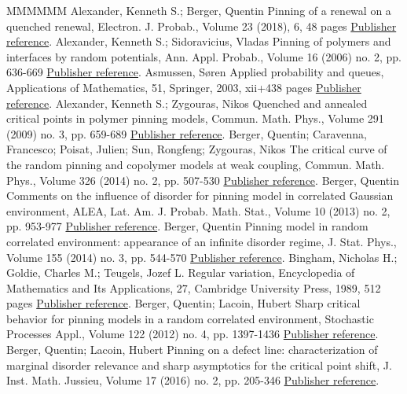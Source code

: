 \documentclass[11pt]{article}
\theoremstyle{definition}
\numberwithin{equation}{section}
\numberwithin{figure}{section}
\numberwithin{table}{section}
\begin{document}
\begin{thebibliography}{MMMMMM}
 Alexander, Kenneth S.; Berger, Quentin Pinning of a renewal on a quenched renewal, Electron. J. Probab., Volume 23 (2018), 6, 48 pages \href{https://ahl.centre-mersenne.org/item/AHL_2019__2__281_0/#A17_1}{Publisher reference}.
 Alexander, Kenneth S.; Sidoravicius, Vladas Pinning of polymers and interfaces by random potentials, Ann. Appl. Probab., Volume 16 (2006) no. 2, pp. 636-669 \href{https://ahl.centre-mersenne.org/item/AHL_2019__2__281_0/#AS06}{Publisher reference}.
 Asmussen, Søren Applied probability and queues, Applications of Mathematics, 51, Springer, 2003, xii+438 pages \href{https://ahl.centre-mersenne.org/item/AHL_2019__2__281_0/#A2003}{Publisher reference}.
 Alexander, Kenneth S.; Zygouras, Nikos Quenched and annealed critical points in polymer pinning models, Commun. Math. Phys., Volume 291 (2009) no. 3, pp. 659-689 \href{https://ahl.centre-mersenne.org/item/AHL_2019__2__281_0/#AZ09}{Publisher reference}.
 Berger, Quentin; Caravenna, Francesco; Poisat, Julien; Sun, Rongfeng; Zygouras, Nikos The critical curve of the random pinning and copolymer models at weak coupling, Commun. Math. Phys., Volume 326 (2014) no. 2, pp. 507-530 \href{https://ahl.centre-mersenne.org/item/AHL_2019__2__281_0/#BCPSZ14}{Publisher reference}.
 Berger, Quentin Comments on the influence of disorder for pinning model in correlated Gaussian environment, ALEA, Lat. Am. J. Probab. Math. Stat., Volume 10 (2013) no. 2, pp. 953-977 \href{https://ahl.centre-mersenne.org/item/AHL_2019__2__281_0/#B13}{Publisher reference}.
 Berger, Quentin Pinning model in random correlated environment: appearance of an infinite disorder regime, J. Stat. Phys., Volume 155 (2014) no. 3, pp. 544-570 \href{https://ahl.centre-mersenne.org/item/AHL_2019__2__281_0/#B14}{Publisher reference}.
 Bingham, Nicholas H.; Goldie, Charles M.; Teugels, Jozef L. Regular variation, Encyclopedia of Mathematics and Its Applications, 27, Cambridge University Press, 1989, 512 pages \href{https://ahl.centre-mersenne.org/item/AHL_2019__2__281_0/#BGT89}{Publisher reference}.
 Berger, Quentin; Lacoin, Hubert Sharp critical behavior for pinning models in a random correlated environment, Stochastic Processes Appl., Volume 122 (2012) no. 4, pp. 1397-1436 \href{https://ahl.centre-mersenne.org/item/AHL_2019__2__281_0/#BL12}{Publisher reference}.
 Berger, Quentin; Lacoin, Hubert Pinning on a defect line: characterization of marginal disorder relevance and sharp asymptotics for the critical point shift, J. Inst. Math. Jussieu, Volume 17 (2016) no. 2, pp. 205-346 \href{https://ahl.centre-mersenne.org/item/AHL_2019__2__281_0/#BL15}{Publisher reference}.

\end{thebibliography}
\end{document}
